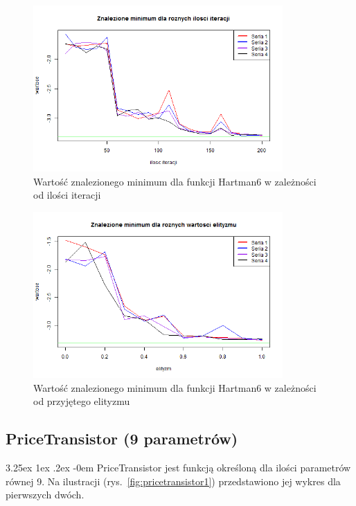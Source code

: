 \documentclass[11pt, a4paper]{article}
\makeatletter
\renewcommand\paragraph{\@startsection{paragraph}{5}{\z@}
  {3.25ex \@plus1ex \@minus.2ex}
  {-0em}
  {\normalfont\normalsize\bfseries}}
\makeatother
\begin{document}
\begin{figure}[H]
	\begin{center}
		\includegraphics[width=0.85\textwidth]{./assets/Hartman65.png}
		\caption{Wartość znalezionego minimum dla funkcji Hartman6 w zależności od ilości iteracji}
		\label{fig:hartman65}
	\end{center}
\end{figure}

\begin{figure}[H]
	\begin{center}
		\includegraphics[width=0.85\textwidth]{./assets/Hartman66.png}
		\caption{Wartość znalezionego minimum dla funkcji Hartman6 w zależności od przyjętego elityzmu}
		\label{fig:hartman66}
	\end{center}
\end{figure}

\newpage
\subsection{PriceTransistor (9 parametrów)}
\paragraph{}
PriceTransistor jest funkcją określoną dla ilości parametrów równej 9. Na ilustracji (rys.~\ref{fig:pricetransistor1}) przedstawiono jej wykres dla pierwszych dwóch.
\end{document}
